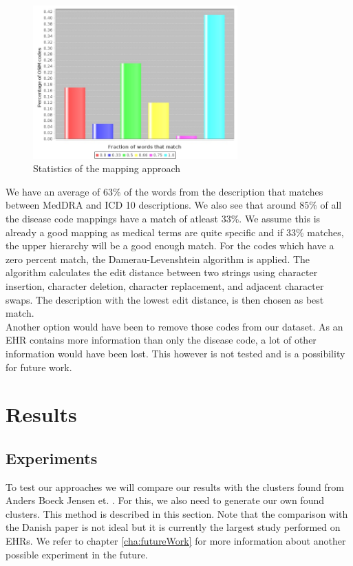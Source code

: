 \begin{figure}[!htb]
	\centering
	\includegraphics[width=0.7\textwidth]{mappingStats.jpeg}
	\caption{Statistics of the mapping approach}
	\label{fig:mappingStats}
\end{figure}

We have an average of $63$\% of the words from the description that matches between MedDRA and ICD 10 descriptions. We also see that around $85$\% of all the disease code mappings have a match of atleast $33$\%. We assume this is already a good mapping as medical terms are quite specific and if $33$\% matches, the upper hierarchy will be a good enough match. For the codes which have a zero percent match, the Damerau-Levenshtein algorithm \cite{edit:article} is applied. The algorithm calculates the edit distance between two strings using character insertion, character deletion, character replacement, and adjacent character swaps. The description with the lowest edit distance, is then chosen as best match. \\
Another option would have been to remove those codes from our dataset. As an EHR contains more information than only the disease code, a lot of other information would have been lost. This however is not tested and is a possibility for future work. \\

\section{Results}

\subsection{Experiments}
\label{sec:clusterExp}

To test our approaches we will compare our results with the clusters found from Anders Boeck Jensen et. \cite{Brunak:article}. For this, we also need to generate our own found clusters. This method is described in this section. Note that the comparison with the Danish paper is not ideal but it is currently the largest study performed on EHRs. We refer to chapter \ref{cha:futureWork} for more information about another possible experiment in the future. \\

